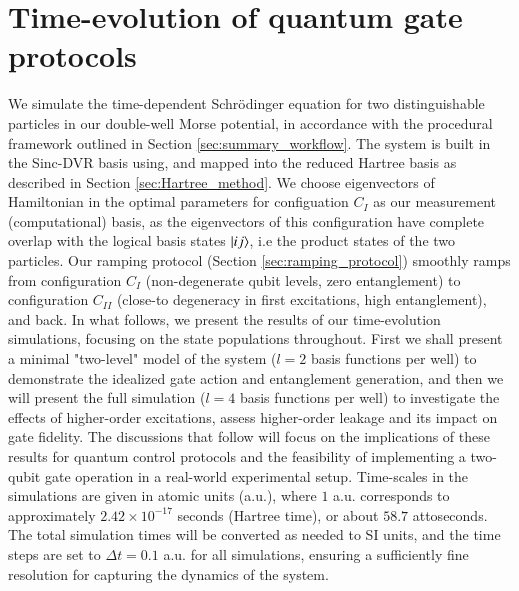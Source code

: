\documentclass{subfiles}
\begin{document}
\section{Time-evolution of quantum gate protocols}\label{sec:time_evolution}
We simulate the time-dependent Schrödinger equation for two distinguishable particles in our double-well Morse potential, in accordance with the procedural framework outlined in Section \ref{sec:summary_workflow}. The system is built in the Sinc-DVR basis using, and mapped into the reduced Hartree basis as described in Section \ref{sec:Hartree_method}. We choose eigenvectors of Hamiltonian in the optimal parameters for configuation $C_I$ as our measurement (computational) basis, as the eigenvectors of this configuration have complete overlap with the logical basis states $\ket{ij}$, i.e the product states of the two particles. Our ramping protocol (Section \ref{sec:ramping_protocol}) smoothly ramps from configuration $C_I$ (non-degenerate qubit levels, zero entanglement) to configuration $C_{II}$ (close-to degeneracy in first excitations, high entanglement), and back. In what follows, we present the results of our time-evolution simulations, focusing on the state populations throughout. First we shall present a minimal "two-level" model of the system ($l=2$ basis functions per well) to demonstrate the idealized gate action and entanglement generation, and then we will present the full simulation ($l=4$ basis functions per well) to investigate the effects of higher-order excitations, assess higher-order leakage and its impact on gate fidelity. The discussions that follow will focus on the implications of these results for quantum control protocols and the feasibility of implementing a two-qubit gate operation in a real-world experimental setup. Time-scales in the simulations are given in atomic units (a.u.), where $1$ a.u. corresponds to approximately $2.42 \times 10^{-17}$ seconds (Hartree time), or about $58.7$ attoseconds. The total simulation times will be converted as needed to SI units, and the time steps are set to $\Delta t = 0.1$ a.u. for all simulations, ensuring a sufficiently fine resolution for capturing the dynamics of the system.
\end{document}

